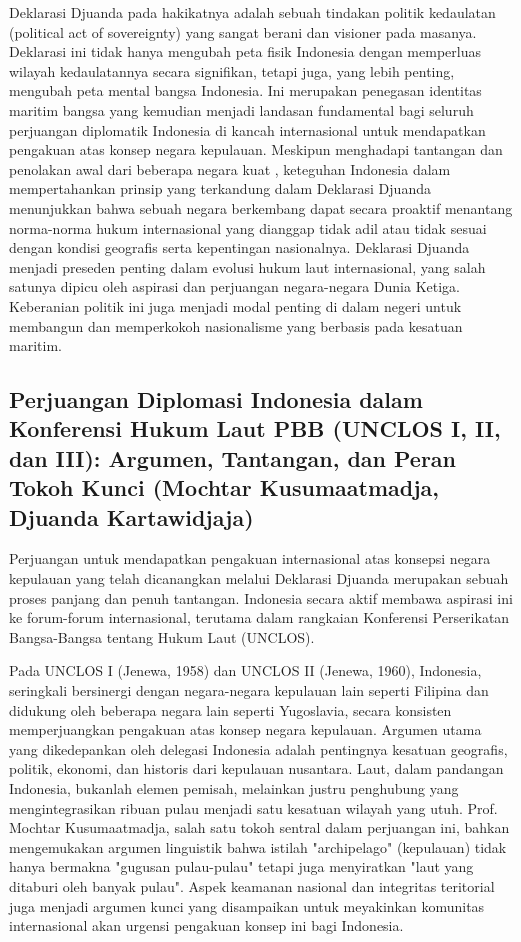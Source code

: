 \documentclass[12pt, a4paper]{article}
\begin{document}
Deklarasi Djuanda pada hakikatnya adalah sebuah tindakan politik kedaulatan (political act of sovereignty) yang sangat berani dan visioner pada masanya. Deklarasi ini tidak hanya mengubah peta fisik Indonesia dengan memperluas wilayah kedaulatannya secara signifikan, tetapi juga, yang lebih penting, mengubah peta mental bangsa Indonesia. Ini merupakan penegasan identitas maritim bangsa yang kemudian menjadi landasan fundamental bagi seluruh perjuangan diplomatik Indonesia di kancah internasional untuk mendapatkan pengakuan atas konsep negara kepulauan. Meskipun menghadapi tantangan dan penolakan awal dari beberapa negara kuat , keteguhan Indonesia dalam mempertahankan prinsip yang terkandung dalam Deklarasi Djuanda menunjukkan bahwa sebuah negara berkembang dapat secara proaktif menantang norma-norma hukum internasional yang dianggap tidak adil atau tidak sesuai dengan kondisi geografis serta kepentingan nasionalnya. Deklarasi Djuanda menjadi preseden penting dalam evolusi hukum laut internasional, yang salah satunya dipicu oleh aspirasi dan perjuangan negara-negara Dunia Ketiga. Keberanian politik ini juga menjadi modal penting di dalam negeri untuk membangun dan memperkokoh nasionalisme yang berbasis pada kesatuan maritim.  
\subsection*{Perjuangan Diplomasi Indonesia dalam Konferensi Hukum Laut PBB (UNCLOS I, II, dan III): Argumen, Tantangan, dan Peran Tokoh Kunci (Mochtar Kusumaatmadja, Djuanda Kartawidjaja)}

Perjuangan untuk mendapatkan pengakuan internasional atas konsepsi negara kepulauan yang telah dicanangkan melalui Deklarasi Djuanda merupakan sebuah proses panjang dan penuh tantangan. Indonesia secara aktif membawa aspirasi ini ke forum-forum internasional, terutama dalam rangkaian Konferensi Perserikatan Bangsa-Bangsa tentang Hukum Laut (UNCLOS).

Pada UNCLOS I (Jenewa, 1958) dan UNCLOS II (Jenewa, 1960), Indonesia, seringkali bersinergi dengan negara-negara kepulauan lain seperti Filipina dan didukung oleh beberapa negara lain seperti Yugoslavia, secara konsisten memperjuangkan pengakuan atas konsep negara kepulauan. Argumen utama yang dikedepankan oleh delegasi Indonesia adalah pentingnya kesatuan geografis, politik, ekonomi, dan historis dari kepulauan nusantara. Laut, dalam pandangan Indonesia, bukanlah elemen pemisah, melainkan justru penghubung yang mengintegrasikan ribuan pulau menjadi satu kesatuan wilayah yang utuh. Prof. Mochtar Kusumaatmadja, salah satu tokoh sentral dalam perjuangan ini, bahkan mengemukakan argumen linguistik bahwa istilah "archipelago" (kepulauan) tidak hanya bermakna "gugusan pulau-pulau" tetapi juga menyiratkan "laut yang ditaburi oleh banyak pulau". Aspek keamanan nasional dan integritas teritorial juga menjadi argumen kunci yang disampaikan untuk meyakinkan komunitas internasional akan urgensi pengakuan konsep ini bagi Indonesia.  
\end{document}

